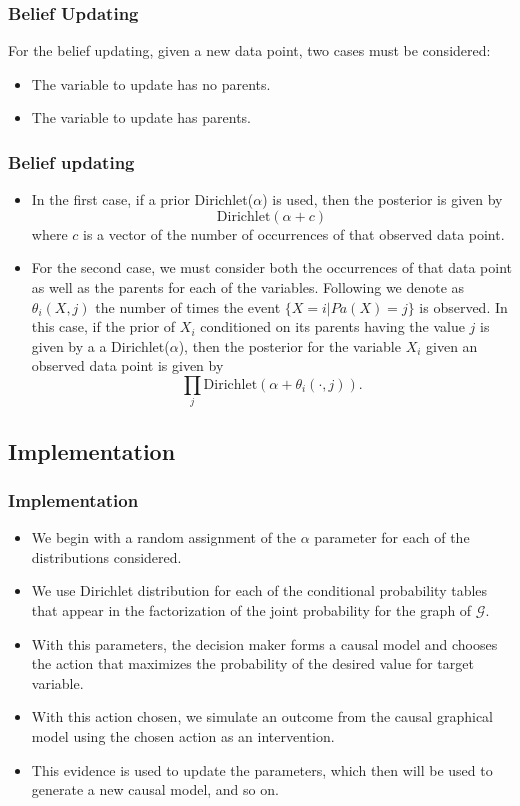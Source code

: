 \documentclass{beamer}
\theoremstyle{plain}
\begin{document}
\begin{frame}
\frametitle{Belief Updating}
For the belief updating, given a new data point,  two cases must be considered:
\begin{itemize}
\item The variable to update has no parents.
\item The variable to update has parents.
\end{itemize}
\end{frame}
\begin{frame}
\frametitle{Belief updating}
\begin{itemize}
\item In the first case, if a prior Dirichlet($\alpha$) is used, then the posterior is given by
\[ \textrm{Dirichlet}(\alpha + c) \]
where $c$ is a vector of the number of occurrences of that observed data point. 
\item For the second case, we must consider both the occurrences of that data point as well as the parents for each of the variables. Following \cite{barber2012bayesian} we denote as $\theta_i(X,j)$ the number of times the event $\{X=i | Pa(X)=j\}$ is observed. In this case, if the prior of $X_i$ conditioned on its parents having the value $j$ is given by a a Dirichlet($\alpha$), then the posterior for the variable $X_i$ given an observed data point is given by 
\[ \prod_j \textrm{Dirichlet}(\alpha + \theta_i(\cdot,j)). \]
\end{itemize}
\end{frame}

\subsection{Implementation}
\begin{frame}
\frametitle{Implementation}
\begin{itemize}
\item We begin with a random assignment of the $\alpha$ parameter for each of the distributions considered.
\item  We use Dirichlet distribution for each of the conditional probability tables that appear in the factorization of the joint probability for the graph of $\mathcal{G}$.
\item With this parameters, the decision maker forms a causal model and chooses the action that maximizes the probability of the desired value for target variable.
\item With this action chosen, we simulate an outcome from the causal graphical model using the chosen action as an intervention.
\item This evidence is used to update the parameters, which then will be used to generate a new causal model, and so on.
\end{itemize}
\end{frame}
\end{document}
